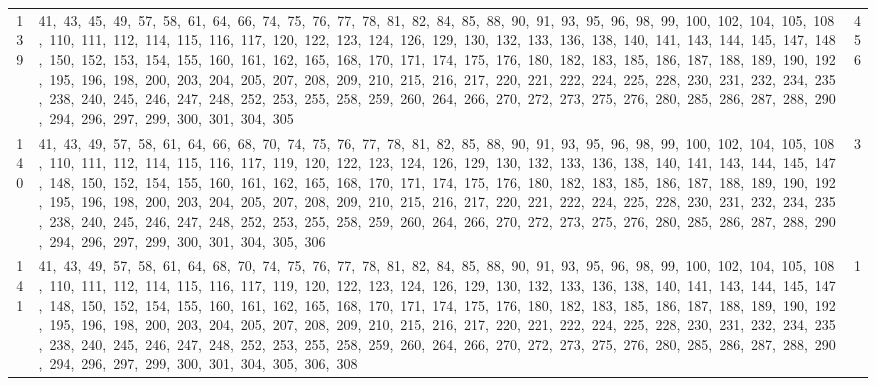 \begin{longtable}{c|p{}|r}
139 & 41,\ 43,\ 45,\ 49,\ 57,\ 58,\ 61,\ 64,\ 66,\ 74,\ 75,\ 76,\ 77,\ 78,\ 81,\ 82,\ 84,\ 85,\ 88,\ 90,\ 91,\ 93,\ 95,\ 96,\ 98,\ 99,\ 100,\ 102,\ 104,\ 105,\ 108,\ 110,\ 111,\ 112,\ 114,\ 115,\ 116,\ 117,\ 120,\ 122,\ 123,\ 124,\ 126,\ 129,\ 130,\ 132,\ 133,\ 136,\ 138,\ 140,\ 141,\ 143,\ 144,\ 145,\ 147,\ 148,\ 150,\ 152,\ 153,\ 154,\ 155,\ 160,\ 161,\ 162,\ 165,\ 168,\ 170,\ 171,\ 174,\ 175,\ 176,\ 180,\ 182,\ 183,\ 185,\ 186,\ 187,\ 188,\ 189,\ 190,\ 192,\ 195,\ 196,\ 198,\ 200,\ 203,\ 204,\ 205,\ 207,\ 208,\ 209,\ 210,\ 215,\ 216,\ 217,\ 220,\ 221,\ 222,\ 224,\ 225,\ 228,\ 230,\ 231,\ 232,\ 234,\ 235,\ 238,\ 240,\ 245,\ 246,\ 247,\ 248,\ 252,\ 253,\ 255,\ 258,\ 259,\ 260,\ 264,\ 266,\ 270,\ 272,\ 273,\ 275,\ 276,\ 280,\ 285,\ 286,\ 287,\ 288,\ 290,\ 294,\ 296,\ 297,\ 299,\ 300,\ 301,\ 304,\ 305 & 456 \\
140 & 41,\ 43,\ 49,\ 57,\ 58,\ 61,\ 64,\ 66,\ 68,\ 70,\ 74,\ 75,\ 76,\ 77,\ 78,\ 81,\ 82,\ 85,\ 88,\ 90,\ 91,\ 93,\ 95,\ 96,\ 98,\ 99,\ 100,\ 102,\ 104,\ 105,\ 108,\ 110,\ 111,\ 112,\ 114,\ 115,\ 116,\ 117,\ 119,\ 120,\ 122,\ 123,\ 124,\ 126,\ 129,\ 130,\ 132,\ 133,\ 136,\ 138,\ 140,\ 141,\ 143,\ 144,\ 145,\ 147,\ 148,\ 150,\ 152,\ 154,\ 155,\ 160,\ 161,\ 162,\ 165,\ 168,\ 170,\ 171,\ 174,\ 175,\ 176,\ 180,\ 182,\ 183,\ 185,\ 186,\ 187,\ 188,\ 189,\ 190,\ 192,\ 195,\ 196,\ 198,\ 200,\ 203,\ 204,\ 205,\ 207,\ 208,\ 209,\ 210,\ 215,\ 216,\ 217,\ 220,\ 221,\ 222,\ 224,\ 225,\ 228,\ 230,\ 231,\ 232,\ 234,\ 235,\ 238,\ 240,\ 245,\ 246,\ 247,\ 248,\ 252,\ 253,\ 255,\ 258,\ 259,\ 260,\ 264,\ 266,\ 270,\ 272,\ 273,\ 275,\ 276,\ 280,\ 285,\ 286,\ 287,\ 288,\ 290,\ 294,\ 296,\ 297,\ 299,\ 300,\ 301,\ 304,\ 305,\ 306 & 3 \\
141 & 41,\ 43,\ 49,\ 57,\ 58,\ 61,\ 64,\ 68,\ 70,\ 74,\ 75,\ 76,\ 77,\ 78,\ 81,\ 82,\ 84,\ 85,\ 88,\ 90,\ 91,\ 93,\ 95,\ 96,\ 98,\ 99,\ 100,\ 102,\ 104,\ 105,\ 108,\ 110,\ 111,\ 112,\ 114,\ 115,\ 116,\ 117,\ 119,\ 120,\ 122,\ 123,\ 124,\ 126,\ 129,\ 130,\ 132,\ 133,\ 136,\ 138,\ 140,\ 141,\ 143,\ 144,\ 145,\ 147,\ 148,\ 150,\ 152,\ 154,\ 155,\ 160,\ 161,\ 162,\ 165,\ 168,\ 170,\ 171,\ 174,\ 175,\ 176,\ 180,\ 182,\ 183,\ 185,\ 186,\ 187,\ 188,\ 189,\ 190,\ 192,\ 195,\ 196,\ 198,\ 200,\ 203,\ 204,\ 205,\ 207,\ 208,\ 209,\ 210,\ 215,\ 216,\ 217,\ 220,\ 221,\ 222,\ 224,\ 225,\ 228,\ 230,\ 231,\ 232,\ 234,\ 235,\ 238,\ 240,\ 245,\ 246,\ 247,\ 248,\ 252,\ 253,\ 255,\ 258,\ 259,\ 260,\ 264,\ 266,\ 270,\ 272,\ 273,\ 275,\ 276,\ 280,\ 285,\ 286,\ 287,\ 288,\ 290,\ 294,\ 296,\ 297,\ 299,\ 300,\ 301,\ 304,\ 305,\ 306,\ 308 & 1 \\

\end{longtable}
